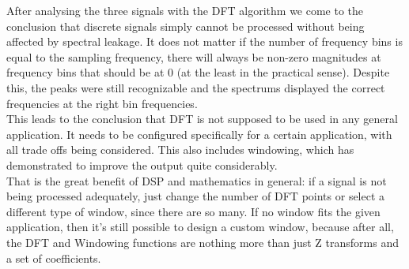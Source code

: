 After analysing the three signals with the DFT algorithm we come to the conclusion that discrete signals simply cannot be processed without being affected by spectral leakage. It does not matter if the number of frequency bins is equal to the sampling frequency, there will always be non-zero magnitudes at frequency bins that should be at 0 (at the least in the practical sense). Despite this, the peaks were still recognizable and the spectrums displayed the correct frequencies at the right bin frequencies.\\

This leads to the conclusion that DFT is not supposed to be used in any general application. It needs to be configured specifically for a certain application, with all trade offs being considered. This also includes windowing, which has demonstrated to improve the output quite considerably.\\

That is the great benefit of DSP and mathematics in general: if a signal is not being processed adequately, just change the number of DFT points or select a different type of window, since there are so many. If no window fits the given application, then it's still possible to design a custom window, because after all, the DFT and Windowing functions are nothing more than just Z transforms and a set of coefficients.